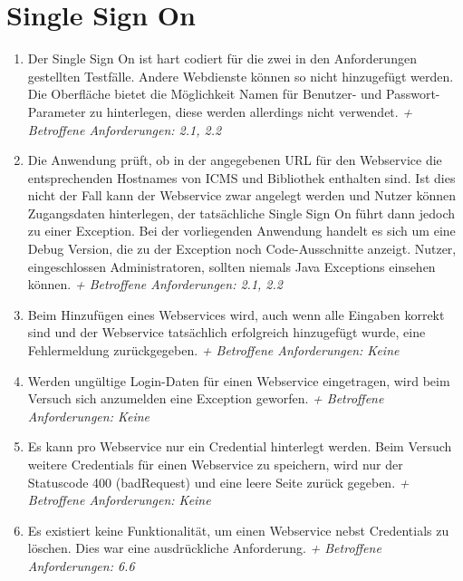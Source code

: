 \documentclass[12pt,DIV14,BCOR10mm,a4paper,parskip=half-,headsepline,headinclude,english,ngerman,bibliography=totocnumbered]{scrreprt}
\begin{document}
\section{Single Sign On}
\begin{enumerate}[resume]
 \item Der Single Sign On ist hart codiert für die zwei in den Anforderungen gestellten Testfälle. Andere Webdienste können so nicht hinzugefügt werden. Die Oberfläche bietet die Möglichkeit Namen für Benutzer- und Passwort-Parameter zu hinterlegen, diese werden allerdings nicht verwendet.\newline
\textit{+ Betroffene Anforderungen: 2.1, 2.2}
  
\item Die Anwendung prüft, ob in der angegebenen URL für den Webservice die entsprechenden Hostnames von ICMS und Bibliothek enthalten sind. Ist dies nicht der Fall kann der Webservice zwar angelegt werden und Nutzer können Zugangsdaten hinterlegen, der tatsächliche Single Sign On führt dann jedoch zu einer Exception. Bei der vorliegenden Anwendung handelt es sich um eine Debug Version, die zu der Exception noch Code-Ausschnitte anzeigt. Nutzer, eingeschlossen Administratoren, sollten niemals Java Exceptions einsehen können.\newline
\textit{+ Betroffene Anforderungen: 2.1, 2.2}
  
\item Beim Hinzufügen eines Webservices wird, auch wenn alle Eingaben korrekt sind und der Webservice tatsächlich erfolgreich hinzugefügt wurde, eine Fehlermeldung zurückgegeben.\newline
\textit{+ Betroffene Anforderungen: Keine}
  
\item Werden ungültige Login-Daten für einen Webservice eingetragen, wird beim Versuch sich anzumelden eine Exception geworfen.\newline
\textit{+ Betroffene Anforderungen: Keine} 

\item Es kann pro Webservice nur ein Credential hinterlegt werden. Beim Versuch weitere Credentials für einen Webservice zu speichern, wird nur der Statuscode 400 (badRequest) und eine leere Seite zurück gegeben.\newline
\textit{+ Betroffene Anforderungen: Keine} 

\item Es existiert keine Funktionalität, um einen Webservice nebst Credentials zu löschen. Dies war eine ausdrückliche Anforderung.\newline
\textit{+ Betroffene Anforderungen: 6.6}
 \end{enumerate}
 
\end{document}
